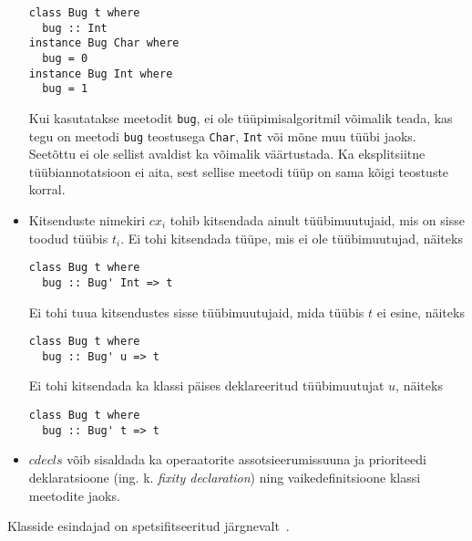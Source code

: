 \documentclass[12pt]{article}
\begin{document}
\begin{itemize}
            \begin{verbatim}class Bug t where
  bug :: Int
instance Bug Char where
  bug = 0
instance Bug Int where
  bug = 1\end{verbatim}

            Kui kasutatakse meetodit \verb!bug!, ei ole tüüpimisalgoritmil võimalik teada, kas tegu on meetodi \verb!bug! teostusega \verb!Char!, \verb!Int! või mõne muu tüübi jaoks. Seetõttu ei ole sellist avaldist ka võimalik väärtustada. Ka eksplitsiitne tüübiannotatsioon ei aita, sest sellise meetodi tüüp on sama kõigi teostuste korral.
          \item
            Kitsenduste nimekiri $cx_i$ tohib kitsendada ainult tüübimuutujaid, mis on sisse toodud tüübis $t_i$. Ei tohi kitsendada tüüpe, mis ei ole tüübimuutujad, näiteks

            \begin{verbatim}class Bug t where
  bug :: Bug' Int => t\end{verbatim}

            Ei tohi tuua kitsendustes sisse tüübimuutujaid, mida tüübis $t$ ei esine, näiteks

            \begin{verbatim}class Bug t where
  bug :: Bug' u => t\end{verbatim}

            Ei tohi kitsendada ka klassi päises deklareeritud tüübimuutujat $u$, näiteks

            \begin{verbatim}class Bug t where
  bug :: Bug' t => t\end{verbatim}
          \item
            $cdecls$ võib sisaldada ka operaatorite assotsieerumissuuna ja prioriteedi deklaratsioone (ing. k. \textit{fixity declaration}) ning vaikedefinitsioone klassi meetodite jaoks.
        \end{itemize}

        Klasside esindajad on spetsifitseeritud järgnevalt~\cite{Has}.
\end{document}
